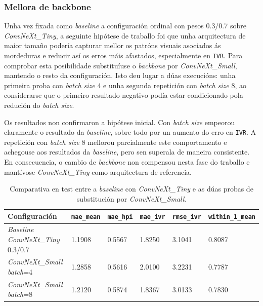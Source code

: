 \subsubsection{Mellora de backbone}
Unha vez fixada como \textit{baseline} a configuración ordinal con pesos 0.3/0.7 sobre
\textit{ConvNeXt\_Tiny}, a seguinte hipótese de traballo foi que unha arquitectura de maior tamaño
podería capturar mellor os patróns visuais asociados ás mordeduras e reducir así os erros máis
afastados, especialmente en \texttt{IVR}. Para comprobar esta posibilidade substituíuse o
\textit{backbone} por \textit{ConvNeXt\_Small}, mantendo o resto da configuración.
Isto deu lugar a dúas execucións: unha primeira proba con \textit{batch size} 4 e
unha segunda repetición con \textit{batch size} 8, ao considerarse que o primeiro resultado
negativo podía estar condicionado pola redución do \textit{batch size}.

Os resultados non confirmaron a hipótese inicial. Con \textit{batch size} empeorou claramente o resultado da \textit{baseline},
sobre todo por un aumento do erro en \texttt{IVR}. A repetición con \textit{batch size} 8 mellorou
parcialmente este comportamento e achegouse aos resultados da \textit{baseline}, pero sen superala de maneira
consistente. En consecuencia, o cambio de \textit{backbone} non compensou nesta fase do traballo e
mantívose \textit{ConvNeXt\_Tiny} como arquitectura de referencia.

{
\begin{table}[htbp]
    \centering
    \footnotesize
    \setlength{\tabcolsep}{4pt}
    \begin{tabular}{p{}|p{}|p{}|p{}|p{}|p{}}
        \rowcolor{udcpink!25}
        \textbf{Configuración} & \textbf{\texttt{mae\_mean}} & \textbf{\texttt{mae\_hpi}} & \textbf{\texttt{mae\_ivr}} & \textbf{\texttt{rmse\_ivr}} & \textbf{\texttt{within\_1\_mean}} \\\hline
        \textit{Baseline} \textit{ConvNeXt\_Tiny} 0.3/0.7 & 1.1908 & 0.5567 & 1.8250 & 3.1041 & 0.8087 \\
        \textit{ConvNeXt\_Small} \textit{batch}=4 & 1.2858 & 0.5616 & 2.0100 & 3.2231 & 0.7787 \\
        \textit{ConvNeXt\_Small} \textit{batch}=8 & 1.2120 & 0.5874 & 1.8367 & 3.0133 & 0.7830 \\
    \end{tabular}
    \caption{Comparativa en test entre a \textit{baseline} con \textit{ConvNeXt\_Tiny} e as dúas probas de substitución por \textit{ConvNeXt\_Small}.}
    \label{tab:comparativa-backbone-small}
\end{table}
}

